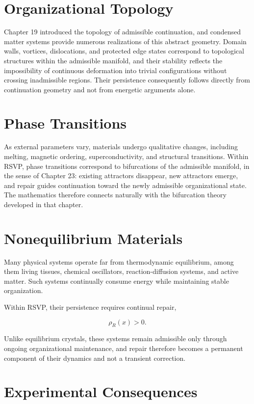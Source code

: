 \documentclass[11pt,oneside]{book}
\numberwithin{equation}{chapter}
\theoremstyle{definition}
\theoremstyle{plain}
\begin{document}
\section{Organizational Topology}

Chapter 19 introduced the topology of admissible continuation, and condensed matter systems provide numerous realizations of this abstract geometry. Domain walls, vortices, dislocations, and protected edge states correspond to topological structures within the admissible manifold, and their stability reflects the impossibility of continuous deformation into trivial configurations without crossing inadmissible regions. Their persistence consequently follows directly from continuation geometry and not from energetic arguments alone.

\section{Phase Transitions}

As external parameters vary, materials undergo qualitative changes, including melting, magnetic ordering, superconductivity, and structural transitions. Within RSVP, phase transitions correspond to bifurcations of the admissible manifold, in the sense of Chapter 23: existing attractors disappear, new attractors emerge, and repair guides continuation toward the newly admissible organizational state. The mathematics therefore connects naturally with the bifurcation theory developed in that chapter.

\section{Nonequilibrium Materials}

Many physical systems operate far from thermodynamic equilibrium, among them living tissues, chemical oscillators, reaction-diffusion systems, and active matter. Such systems continually consume energy while maintaining stable organization.

Within RSVP, their persistence requires continual repair,

\[
\rho_R(x)>0.
\]

Unlike equilibrium crystals, these systems remain admissible only through ongoing organizational maintenance, and repair therefore becomes a permanent component of their dynamics and not a transient correction.

\section{Experimental Consequences}
\end{document}
